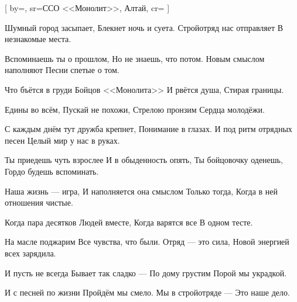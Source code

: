 [
  by={},
  sr={ССО <<Монолит>>, Алтай},
  cr={}
  ]




\beginverse
Шумный город засыпает,
Блекнет ночь и суета.
Стройотряд нас отправляет
В незнакомые места.
\bqk

Вспоминаешь ты о прошлом,
Но не знаешь, что потом.
Новым смыслом наполняют
Песни спетые о том.
\endverse


\beginchorus
Что бъётся в груди
Бойцов <<Монолита>>
И рвётся душа,
Стирая границы.
\bqk

Едины во всём,
Пускай не похожи,
Стрелою пронзим
Сердца молодёжи.
\endchorus


\beginverse
С каждым днём тут дружба крепнет,
Понимание в глазах.
И под ритм отрядных песен
Целый мир у нас в руках.
\bqk

Ты приедешь чуть взрослее
И в обыденность опять,
Ты бойцовочку оденешь,
Гордо будешь вспоминать.
\endverse


\beginverse
Наша жизнь --- игра, 
И наполняется она смыслом 
Только тогда, 
Когда в ней отношения чистые. 
\bqk

Когда пара десятков 
Людей вместе, 
Когда варятся все 
В одном тесте. 
\bqk

На масле поджарим 
Все чувства, что были. 
Отряд --- это сила, 
Новой энергией всех зарядила. 
\bqk

И пусть не всегда
Бывает так сладко --- 
По дому грустим
Порой мы украдкой. 
\bqk

И с песней по жизни
Пройдём мы смело. 
Мы в стройотряде --- 
Это наше дело.
\endverse


\endsong

